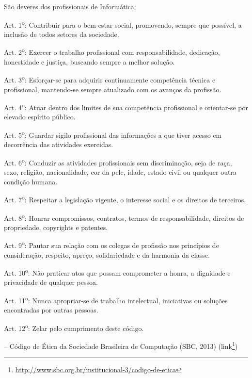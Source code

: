 \documentclass[
  11pt,
  twoside]{book}
\DeclareRobustCommand{\href}[2]{#2\footnote{\url{#1}}}
\renewenvironment{quote}{\centering \vspace{1.5ex} \begin{tcolorbox}[colback=backcolor, width=4.9in]}{\end{tcolorbox}}
\begin{document}
\begin{quote}
São deveres dos profissionais de Informática:

Art. 1\textsuperscript{o}: Contribuir para o bem-estar social,
promovendo, sempre que possível, a inclusão de todos setores da
sociedade.

Art. 2\textsuperscript{o}: Exercer o trabalho profissional com
responsabilidade, dedicação, honestidade e justiça, buscando sempre a
melhor solução.

Art. 3\textsuperscript{o}: Esforçar-se para adquirir continuamente
competência técnica e profissional, mantendo-se sempre atualizado com os
avanços da profissão.

Art. 4\textsuperscript{o}: Atuar dentro dos limites de sua competência
profissional e orientar-se por elevado espírito público.

Art. 5\textsuperscript{o}: Guardar sigilo profissional das informações a
que tiver acesso em decorrência das atividades exercidas.

Art. 6\textsuperscript{o}: Conduzir as atividades profissionais sem
discriminação, seja de raça, sexo, religião, nacionalidade, cor da pele,
idade, estado civil ou qualquer outra condição humana.

Art. 7\textsuperscript{o}: Respeitar a legislação vigente, o interesse
social e os direitos de terceiros.

Art. 8\textsuperscript{o}: Honrar compromissos, contratos, termos de
responsabilidade, direitos de propriedade, copyrights e patentes.

Art. 9\textsuperscript{o}: Pautar sua relação com os colegas de
profissão nos princípios de consideração, respeito, apreço,
solidariedade e da harmonia da classe.

Art. 10\textsuperscript{o}: Não praticar atos que possam comprometer a
honra, a dignidade e privacidade de qualquer pessoa.

Art. 11\textsuperscript{o}: Nunca apropriar-se de trabalho intelectual,
iniciativas ou soluções encontradas por outras pessoas.

Art. 12\textsuperscript{o}: Zelar pelo cumprimento deste código.

-- Código de Ética da Sociedade Brasileira de Computação (SBC, 2013)
(\href{http://www.sbc.org.br/institucional-3/codigo-de-etica}{link})
\end{quote}
\end{document}
